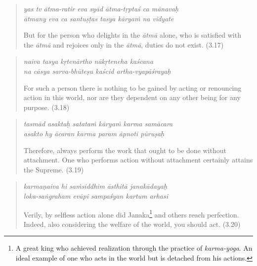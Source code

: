 \documentclass[12pt, twoside, openright]{memoir}
\begin{document}
\par
\begin{verse}
\textit{yas tv ātma-ratir eva syād ātma-tṛptaś ca mānavaḥ} \\
\textit{ātmany eva ca santuṣṭas tasya kāryaṁ na vidyate}

\noindent But for the person who delights in the \textit{ātmā} alone, who is satisfied with the \textit{ātmā} and rejoices only in the \textit{ātmā}, duties do not exist. (3.17)
\end{verse}
\par



\par
\begin{verse}
\textit{naiva tasya kṛtenārtho nākṛteneha kaścana} \\
\textit{na cāsya sarva-bhūteṣu kaścid artha-vyapāśrayaḥ}

\noindent For such a person there is nothing to be gained by acting or renouncing action in this world, nor are they dependent on any other being for any purpose. (3.18)
\end{verse}
\par



\par
\begin{verse}
\textit{tasmād asaktaḥ satataṁ kāryaṁ karma samācara} \\
\textit{asakto hy ācaran karma param āpnoti pūruṣaḥ}

\noindent Therefore, always perform the work that ought to be done without attachment. One who performs action without attachment certainly attains the Supreme. (3.19)
\end{verse}
\par



\par
\begin{verse}
\textit{karmaṇaiva hi saṁsiddhim āsthitā janakādayaḥ} \\
\textit{loka-saṅgraham evāpi sampaśyan kartum arhasi}

\noindent Verily, by selfless action alone did Janaka\footnote{A great king who achieved realization through the practice of \textit{karma-yoga}. An ideal example of one who acts in the world but is detached from his actions.} and others reach perfection. Indeed, also considering the welfare of the world, you should act. (3.20)
\end{verse}
\par
\end{document}
